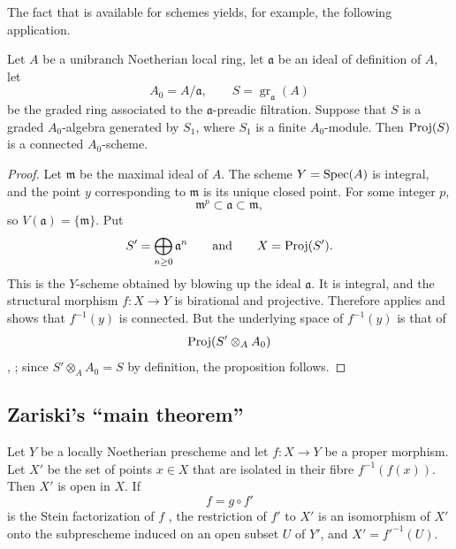 The fact that  is available for schemes yields, for
example, the following application.

\begin{proposition}[4.3.13]
\label{III.4.3.13}
Let $A$ be a unibranch Noetherian local ring, let $\mathfrak{a}$ be
an ideal of definition of $A$, let
\[
  A_0=A/\mathfrak{a},
  \qquad
  S=\operatorname{gr}_{\mathfrak{a}}(A)
\]
be the graded ring associated to the $\mathfrak{a}$-preadic
filtration.  Suppose that $S$ is a graded $A_0$-algebra generated by
$S_1$, where $S_1$ is a finite $A_0$-module.  Then $\operatorname{Proj}(S)$ is a
connected $A_0$-scheme.
\end{proposition}

\begin{proof}
Let $\mathfrak{m}$ be the maximal ideal of $A$.  The scheme
$Y=\operatorname{Spec}(A)$ is integral, and the point $y$ corresponding to
$\mathfrak{m}$ is its unique closed point.  For some integer $p$,
\[
  \mathfrak{m}^p\subset\mathfrak{a}\subset\mathfrak{m},
\]
so $V(\mathfrak{a})=\{\mathfrak{m}\}$.  Put
\[
  S'=\bigoplus_{n\geq0}\mathfrak{a}^n
  \qquad\text{and}\qquad
  X=\operatorname{Proj}(S').
\]
This is the $Y$-scheme obtained by blowing up the ideal
$\mathfrak{a}$.  It is integral, and the structural morphism
$f:X\to Y$ is birational  and projective.
Therefore  applies and shows that $f^{-1}(y)$ is
connected.  But the underlying space of $f^{-1}(y)$ is that of
\[
  \operatorname{Proj}(S'\otimes_A A_0)
\]
, ; since
$S'\otimes_AA_0=S$ by definition, the proposition follows.
\end{proof}


\subsection{Zariski's ``main theorem''}
\label{subsection:III.4.4}

\begin{proposition}[4.4.1]
\label{III.4.4.1}
Let $Y$ be a locally Noetherian prescheme and let $f:X\to Y$ be a
proper morphism.  Let $X'$ be the set of points $x\in X$ that are
isolated in their fibre $f^{-1}(f(x))$.  Then $X'$ is open in $X$.
If
\[
  f=g\circ f'
\]
is the Stein factorization of $f$ , the restriction
of $f'$ to $X'$ is an isomorphism of $X'$ onto the subprescheme
induced on an open subset $U$ of $Y'$, and
$X'=f'^{-1}(U)$.
\end{proposition}


